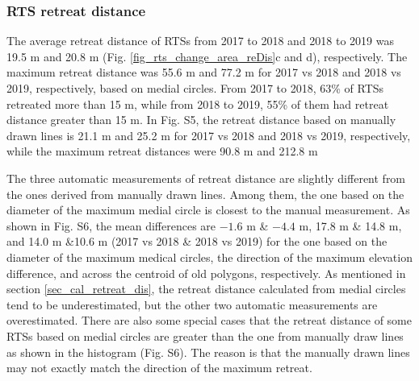 \documentclass[authoryear,preprint,review,12pt]{elsarticle}
\begin{document}


\subsubsection{RTS retreat distance}
\label{sec_rts_retreat_distance}

The average retreat distance of RTSs from 2017 to 2018 and 2018 to 2019 was 19.5 m and 20.8 m (Fig. \ref{fig_rts_change_area_reDis}c and d), respectively. 
The maximum retreat distance was 55.6 m and 77.2 m for 2017 vs 2018 and 2018 vs 2019, respectively, based on medial circles. 
From 2017 to 2018, 63\% of RTSs retreated more than 15 m, while from 2018 to 2019, 55\% of them had retreat distance greater than 15 m. 
In Fig. S5, the retreat distance based on manually drawn lines is 21.1 m and 25.2 m for 2017 vs 2018 and 2018 vs 2019, respectively, while the maximum retreat distances were 90.8 m and 212.8 m

The three automatic measurements of retreat distance are slightly different from the ones derived from manually drawn lines. Among them, the one based on the diameter of the maximum medial circle is closest to the manual measurement. 
As shown in Fig. S6, the mean differences are $-1.6$ m \& $-4.4$ m, 17.8 m \& 14.8 m, and 14.0 m \&10.6 m (2017 vs 2018 \& 2018 vs 2019) for the one based on the diameter of the maximum medical circles, the direction of the maximum elevation difference, and across the centroid of old polygons, respectively. 
As mentioned in section \ref{sec_cal_retreat_dis}, the retreat distance calculated from medial circles tend to be underestimated, but the other two automatic measurements are overestimated. 
There are also some special cases that the retreat distance of some RTSs based on medial circles are greater than the one from manually draw lines as shown in the histogram (Fig. S6).
The reason is that the manually drawn lines may not exactly match the direction of the maximum retreat.  
\end{document}
